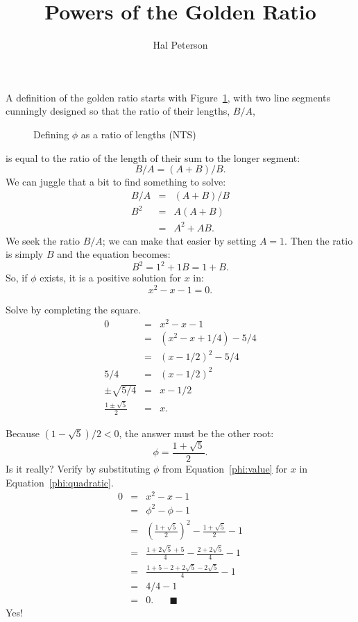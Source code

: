 \documentclass{article}
\title{Powers of the Golden Ratio}
\author{Hal Peterson}
\begin{document}
\maketitle

A definition of the golden ratio starts with Figure~\ref{fig:phi}, with two line segments cunningly designed so that the ratio of their lengths, $B/A$,
\begin{figure}
  \caption{Defining $\phi$ as a ratio of lengths (NTS)}
  \label{fig:phi}
\end{figure}
is equal to the ratio of the length of their sum to the longer segment:
\begin{equation}
  B/A = (A+B)/B.
  \label{phi:ratios}
\end{equation}
We can juggle that a bit to find something to solve:
\begin{eqnarray*}
  B/A & = & (A + B)/B \\
  B^2 & = & A (A + B) \\
  & = & A^2 + AB.
\end{eqnarray*}
We seek the ratio $B/A$; we can make that easier by setting $A=1$.
Then the ratio is simply $B$ and the equation becomes:
\begin{equation*}
  B^2 = 1^2 + 1B = 1 + B.
\end{equation*}
So, if $\phi$ exists, it is a positive solution for $x$ in:
\begin{equation}
  x^2 - x - 1 = 0.
  \label{phi:quadratic}
\end{equation}

Solve by completing the square.
\begin{eqnarray*}
  0 & = & x^2 - x - 1 \\
  & = & (x^2 - x + 1/4) - 5/4 \\
  & = & (x - 1/2)^2 - 5/4 \\
  5/4 & = & (x - 1/2)^2 \\
  \pm\sqrt{5/4} & = & x - 1/2 \\
  \frac{1 \pm \sqrt{5}}{2} & = & x.
\end{eqnarray*}

Because $(1-\sqrt{5})/2 < 0$, the answer must be the other root:
\begin{equation}
  \phi = \frac{1 + \sqrt{5}}{2}.
  \label{phi:value}
\end{equation}
Is it really?  Verify by substituting $\phi$ from Equation~\ref{phi:value} for $x$ in Equation~\ref{phi:quadratic}.
\begin{eqnarray*}
  0 & = & x^2 - x - 1 \\
  & = & \phi^2 - \phi - 1 \\
  & = & \left(\frac{1 + \sqrt{5}}{2}\right)^2 - \frac{1 + \sqrt{5}}{2} - 1 \\
  & = & \frac{1 + 2\sqrt{5} + 5}{4} - \frac{2 + 2\sqrt{5}}{4} - 1 \\
  & = & \frac{1 + 5 - 2 + 2\sqrt{5} - 2\sqrt{5}}{4} - 1 \\
  & = & 4/4 - 1 \\
  & = & 0. \hspace{20pt}\blacksquare
\end{eqnarray*}
Yes!
\end{document}
